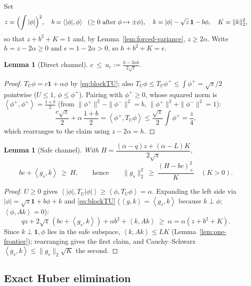 \documentclass[11pt]{article}
\newtheorem{lemma}[theorem]{Lemma}
\newcommand{\one}{\mathbf 1}
\newcommand{\ip}[2]{\left\langle #1,#2\right\rangle}
\newcommand{\pos}[1]{\left(#1\right)_{+}}
\begin{document}
Set
\begin{equation}\label{eq:shape-defs}
        z=\Bigl(\int|\phi|\Bigr)^2,\quad
        b=\ip{|\phi|}{\phi}\ \ (\ge0\ \text{after}\ \phi\mapsto\pm\phi),\quad
        k=|\phi|-\sqrt z\,\one-b\phi,\quad K=\|k\|_2^2 ,
\end{equation}
so that $z+b^2+K=1$ and, by Lemma~\ref{lem:forced-variance}, $z\ge2\alpha$.
Write $h=z-2\alpha\ge0$ and $e=1-2\alpha>0$, so $h+b^2+K=e$.

\begin{lemma}[Direct channel]\label{lem:direct}
$\displaystyle c\ \le\ u_c:=\frac{h-2\alpha b}{2\sqrt z}$.
\end{lemma}

\begin{proof}
$T_U\phi=c\one+\alpha\phi$ by \eqref{eq:blockTU}; also
$T_U\phi\le T_U\phi^+\le\int\phi^+=\sqrt z/2$ pointwise ($U\le1$,
$\phi\le\phi^+$).  Pairing with $\phi^+\ge0$, whose squared norm is
$\ip{\phi^+}{\phi^+}=\tfrac{1+b}2$ (from
$\|\phi^+\|^2-\|\phi^-\|^2=b$, $\|\phi^+\|^2+\|\phi^-\|^2=1$):
\[
        \frac{c\sqrt z}{2}+\alpha\,\frac{1+b}{2}
        =\ip{\phi^+}{T_U\phi}
        \le\frac{\sqrt z}{2}\int\phi^+=\frac z4 ,
\]
which rearranges to the claim using $z-2\alpha=h$.
\end{proof}

\begin{lemma}[Safe channel]\label{lem:safe}
With $H=\dfrac{(\alpha-q)z+(\alpha-L)K}{2\sqrt z}$,
\[
        bc+\ip{g_s}{k}\ \ge\ H,
        \qquad\text{hence}\qquad
        \|g_s\|_2^2\ \ge\ \frac{\pos{H-bc}^2}{K}\quad(K>0).
\]
\end{lemma}

\begin{proof}
$U\ge0$ gives $\ip{|\phi|}{T_U|\phi|}\ge\ip{\phi}{T_U\phi}=\alpha$.  Expanding
the left side via $|\phi|=\sqrt z\one+b\phi+k$ and \eqref{eq:blockTU}
($\ip gk=\ip{g_s}k$ because $k\perp\phi$; $\ip{\phi}{Ak}=0$):
\[
        qz+2\sqrt z\,(bc+\ip{g_s}k)+\alpha b^2+\ip k{Ak}\ \ge\ \alpha
        =\alpha(z+b^2+K).
\]
Since $k\perp\one,\phi$ lies in the safe subspace, $\ip k{Ak}\le LK$
(Lemma~\ref{lem:one-frontier}); rearranging gives the first claim, and
Cauchy--Schwarz $\ip{g_s}k\le\|g_s\|_2\sqrt K$ the second.
\end{proof}

\subsection{Exact Huber elimination}
\end{document}
